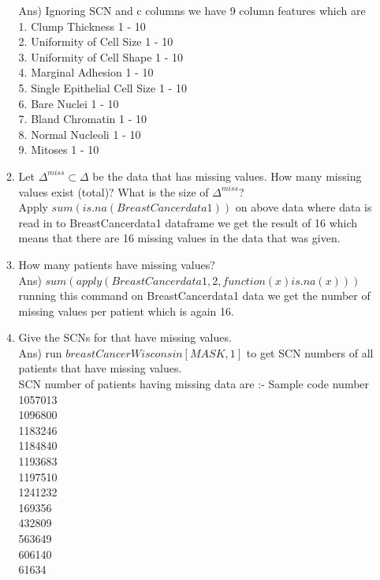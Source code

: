 \documentclass{article}
\begin{document}
\begin{enumerate}
\begin{enumerate}
 Ans) Ignoring SCN and c columns we have 9 column features which are \\
   1. Clump Thickness               1 - 10 \\
   2. Uniformity of Cell Size       1 - 10 \\ 
   3. Uniformity of Cell Shape      1 - 10 \\
   4. Marginal Adhesion             1 - 10 \\
   5. Single Epithelial Cell Size   1 - 10 \\
   6. Bare Nuclei                   1 - 10 \\
   7. Bland Chromatin               1 - 10 \\
   8. Normal Nucleoli               1 - 10 \\
   9. Mitoses                       1 - 10 \\
 \item Let $\Delta^{miss}\subset \Delta$ be the data that has missing values.  How many missing values exist (total)?  What is the size of $\Delta^{miss}$? \\
 Apply $sum(is.na(BreastCancerdata1))$ on above data where data is read in to BreastCancerdata1 dataframe we get the result of 16 which means that there are 16 missing values in the data that was given.
 \item How many patients have missing values? \\
 Ans) $sum(apply(BreastCancerdata1,2,function(x) is.na(x)))$ running this command on BreastCancerdata1 data we get the number of missing values per patient which is again 16.
 \item Give the SCNs for that have missing values.  \\
Ans) run $breastCancerWisconsin[MASK,1]$ to get SCN numbers of all patients that have missing values. \\
SCN number of patients having missing data are :-
    Sample code number \\ 
1057013 \\
1096800 \\
1183246 \\
1184840 \\
1193683 \\
1197510 \\
1241232 \\
169356 \\
432809 \\
563649 \\
606140 \\
61634 \\

\end{enumerate}
\end{enumerate}
\end{document}
